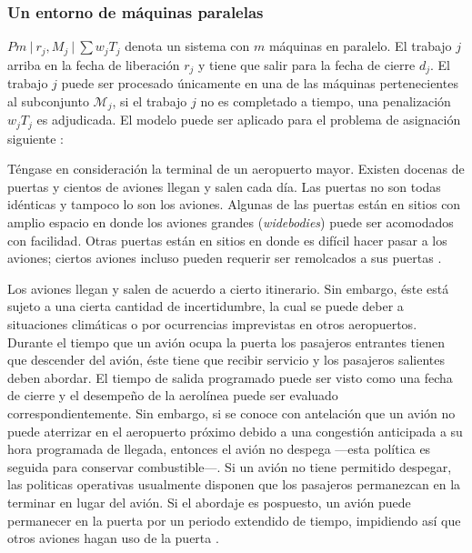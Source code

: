 \documentclass[spanish,draft,12pt,headsepline,footsepline,paper=letter]{scrreprt}
\newenvironment{simple}{\setlength{\parindent}{0pt}}{}
\begin{document}
\subsubsection{Un entorno de máquinas paralelas}

\begin{simple}
  $Pm \: \lvert \: r_j,M_j \: \lvert \: \sum w_jT_j$ denota un sistema con $m$ máquinas en paralelo. El trabajo $j$ arriba en la fecha de liberación $r_j$ y tiene que salir para la fecha de cierre $d_j$. El trabajo $j$ puede ser procesado únicamente en una de las máquinas pertenecientes al subconjunto $\mathcal{M}_j$, si el trabajo $j$ no es completado a tiempo, una penalización $w_jT_j$ es adjudicada. El modelo puede ser aplicado para el problema de asignación siguiente \citep[p.~20]{Pinedo1995}:
\end{simple}

Téngase en consideración la terminal de un aeropuerto mayor. Existen docenas de puertas y cientos de aviones llegan y salen cada día. Las puertas no son todas idénticas y tampoco lo son los aviones. Algunas de las puertas están en sitios con amplio espacio en donde los aviones grandes (\textit{widebodies}) puede ser acomodados con facilidad. Otras puertas están en sitios en donde es difícil hacer pasar a los aviones; ciertos aviones incluso pueden requerir ser remolcados a sus puertas \citep[p.~2,~3]{Pinedo1995}.

Los aviones llegan y salen de acuerdo a cierto itinerario. Sin embargo, éste está sujeto a una cierta cantidad de incertidumbre, la cual se puede deber a situaciones climáticas o por ocurrencias imprevistas en otros aeropuertos. Durante el tiempo que un avión ocupa la puerta los pasajeros entrantes tienen que descender del avión, éste tiene que recibir servicio y los pasajeros salientes deben abordar. El tiempo de salida programado puede ser visto como una fecha de cierre y el desempeño de la aerolínea puede ser evaluado correspondientemente. Sin embargo, si se conoce con antelación que un avión no puede aterrizar en el aeropuerto próximo debido a una congestión anticipada a su hora programada de llegada, entonces el avión no despega —esta política es seguida para conservar combustible—. Si un avión no tiene permitido despegar, las politicas operativas usualmente disponen que los pasajeros permanezcan en la terminar en lugar del avión. Si el abordaje es pospuesto, un avión puede permanecer en la puerta por un periodo extendido de tiempo, impidiendo así que otros aviones hagan uso de la puerta \citep[p.~3]{Pinedo1995}.
\end{document}
